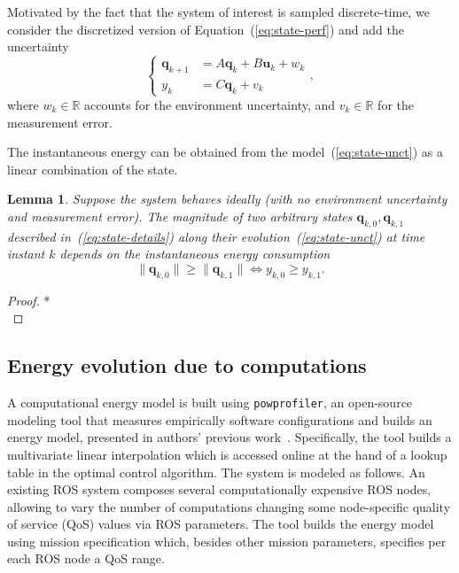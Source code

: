 \documentclass[letterpaper,10pt,conference]{ieeeconf}
\newcommand{\stt}[1]{{\small\tt #1}} %
\newcommand{\powprof}{\stt{powprofiler}}
\newtheorem{lem}[thm]{Lemma}
\begin{document}
Motivated by the fact that the system of interest is sampled discrete-time, we consider the discretized version of Equation~(\ref{eq:state-perf}) and add the uncertainty
\begin{equation}\label{eq:state-unct}
  \begin{cases}
  \mathbf{q}_{k+1}&=A\mathbf{q}_{k}+B\mathbf{u}_{k}+w_k\\
  y_k&=C\mathbf{q}_k+v_k
  \end{cases},
\end{equation}
where $w_k\in\mathbb{R}$ accounts for the environment uncertainty, and $v_k\in\mathbb{R}$ for the measurement error.

The instantaneous energy can be obtained from the model~(\ref{eq:state-unct}) as a linear combination of the state.

\begin{lem}\label{lem:state-vs-energy}
  Suppose the system behaves ideally (with no environment uncertainty and measurement error).
  The magnitude of two arbitrary states $\mathbf{q}_{k,0},\mathbf{q}_{k,1}$ described in~(\ref{eq:state-details}) along their evolution~(\ref{eq:state-unct}) at time instant $k$ depends on the instantaneous energy consumption
  \begin{equation}
    \|\mathbf{q}_{k,0}\|\geq\|\mathbf{q}_{k,1}\|\iff y_{k,0}\geq y_{k,1}.
  \end{equation}
\end{lem}
\begin{proof}
  *\\
\end{proof}

\subsection{Energy evolution due to computations}
\label{sec:computations-model}

A computational energy model is built using \powprof{}, an open-source modeling tool that measures empirically software configurations and builds an energy model, presented in authors' previous work~\cite{seewald2019coarse}. Specifically, the tool builds a multivariate linear interpolation which is accessed online at the hand of a lookup table in the optimal control algorithm. The system is modeled as follows. An existing ROS system composes several computationally expensive ROS nodes, allowing to vary the number of computations changing some node-specific quality of service (QoS) values via ROS parameters. The tool builds the energy model using mission specification which, besides other mission parameters, specifies per each ROS node a QoS range.
\end{document}
